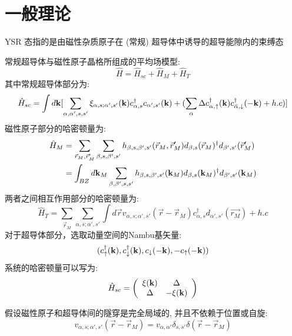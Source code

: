 \section{一般理论}
YSR 态指的是由磁性杂质原子在 (常规) 超导体中诱导的超导能隙内的束缚态\par
常规超导体与磁性原子晶格所组成的平均场模型:
\[\hat{H}=\hat{H}_{sc}+\hat{H}_M+\hat{H}_{T}\]
其中常规超导体部分为:
\[\hat{H}_{sc}=\int d\bold{k}[\sum_{\alpha,\alpha',s,s'} \xi_{\alpha,s;\alpha',s'}(\bold{k})c_{\alpha,s}^\dagger c_{\alpha',s'}(\bold{k})+(\sum_\alpha \Delta c_{\alpha,\uparrow}^\dagger(\bold{k})c_{\bar{\alpha},\downarrow}
^\dagger(-\bold{k})+h.c)]\]
磁性原子部分的哈密顿量为:
\begin{align*}
\hat{H}_M&=\sum_{\vec{r}_M,\vec{r}'_M}\sum_{\beta,s,\beta',s'}h_{\beta,s,\beta',s'}(\vec{r}_M,\vec{r}'_M)d_{\beta,s}(\vec{r}_M)^\dagger d_{\beta',s'}(\vec{r}'_M)\\
&=\int_{BZ}d\bold{k}_M\sum_{\beta,\beta',s,s'}h_{\beta,s,\beta',s'}(\bold{k}_M)d_{\beta,s}(\bold{k}_M)^\dagger d_{\beta',s'}(\bold{k}_M)
\end{align*}
两者之间相互作用部分的哈密顿量为:
\[\hat{H}_T=\sum_{\vec{r}_M}\sum_{\alpha,s;\alpha',s'}\int d\vec{r} v_{\alpha,s;\alpha',s'}(\vec{r}-\vec{r}_M)c_{\alpha,s}^\dagger d_{\alpha',s'}(\vec{r_M})+h.c\]
对于超导体部分，选取动量空间的Nambu基矢量:
\[(c_{\uparrow}^\dagger(\bold{k}),c_{\downarrow}^\dagger(\bold{k}),c_{\downarrow}(\bold{-k}),-c_{\uparrow}(\bold{-k}))\]
系统的哈密顿量可以写为:
\begin{align}
\hat{H}_{sc}=\left(\begin{array}{cc}
\bold{\xi}(\bold{k})&\Delta\\
\Delta&-\bold{\xi}(\bold{k})\\
\end{array}
\right)
\end{align}

 假设磁性原子和超导体间的隧穿是完全局域的, 并且不依赖于位置或自旋:
 \[v_{\alpha,s;\alpha',s'}(\vec{r}-\vec{r}_M)=v_{\alpha,\alpha'}\delta_{s,s'}\delta(\vec{r}-\vec{r}_M)\]


